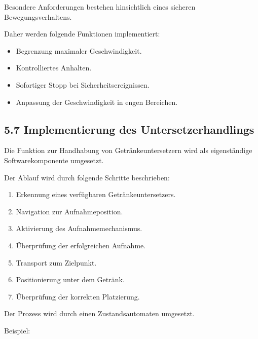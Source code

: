 \documentclass[
  a4paper,
  12pt,
  DIV=12,        %
  parskip=half,  %
  headings=small %
]{scrartcl}
\theoremstyle{definition}
\providecommand{\tightlist}{%
  \setlength{\itemsep}{0pt}\setlength{\parskip}{0pt}}
\theoremstyle{definition}
\providecommand{\tightlist}{%
  \setlength{\itemsep}{0pt}\setlength{\parskip}{0pt}}
\newenvironment{Shaded}{\begin{snugshade}}{\end{snugshade}}
\begin{document}
Besondere Anforderungen bestehen hinsichtlich eines sicheren
Bewegungsverhaltens.

Daher werden folgende Funktionen implementiert:

\begin{itemize}
\tightlist
\item
  Begrenzung maximaler Geschwindigkeit.
\item
  Kontrolliertes Anhalten.
\item
  Sofortiger Stopp bei Sicherheitsereignissen.
\item
  Anpassung der Geschwindigkeit in engen Bereichen.
\end{itemize}

\subsection{5.7 Implementierung des
Untersetzerhandlings}\label{implementierung-des-untersetzerhandlings}

Die Funktion zur Handhabung von Getränkeuntersetzern wird als
eigenständige Softwarekomponente umgesetzt.

Der Ablauf wird durch folgende Schritte beschrieben:

\begin{enumerate}
\def\labelenumi{\arabic{enumi}.}
\tightlist
\item
  Erkennung eines verfügbaren Getränkeuntersetzers.
\item
  Navigation zur Aufnahmeposition.
\item
  Aktivierung des Aufnahmemechanismus.
\item
  Überprüfung der erfolgreichen Aufnahme.
\item
  Transport zum Zielpunkt.
\item
  Positionierung unter dem Getränk.
\item
  Überprüfung der korrekten Platzierung.
\end{enumerate}

Der Prozess wird durch einen Zustandsautomaten umgesetzt.

Beispiel:

\end{document}
